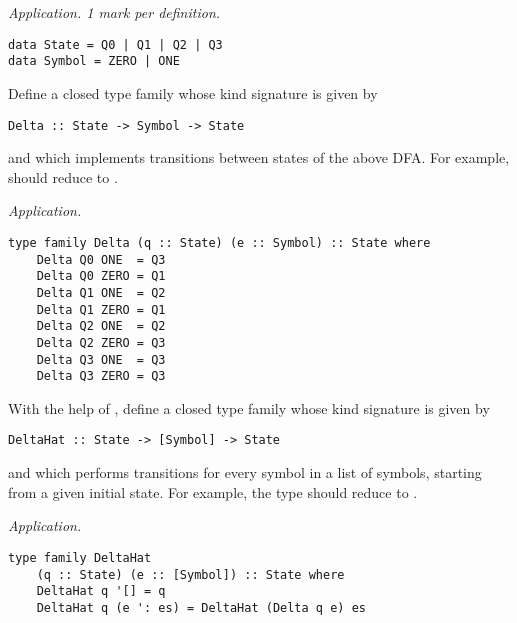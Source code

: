 \begin{parts}
\begin{subparts}
        \begin{solution}
            \emph{Application. 1 mark per definition.}
\begin{verbatim}
data State = Q0 | Q1 | Q2 | Q3 
data Symbol = ZERO | ONE
\end{verbatim}
        \end{solution}
        
        \subpart[4] Define a closed type family whose kind signature is given by
        \vspace*{0.2cm}
\begin{verbatim}
Delta :: State -> Symbol -> State
\end{verbatim}
\vspace*{0.2cm}
        and which implements transitions between states of the above DFA. For example,  should reduce to . \droppoints 
        
        \begin{solution}
            \emph{Application.}
\begin{verbatim}
type family Delta (q :: State) (e :: Symbol) :: State where 
    Delta Q0 ONE  = Q3 
    Delta Q0 ZERO = Q1 
    Delta Q1 ONE  = Q2 
    Delta Q1 ZERO = Q1
    Delta Q2 ONE  = Q2 
    Delta Q2 ZERO = Q3 
    Delta Q3 ONE  = Q3 
    Delta Q3 ZERO = Q3
\end{verbatim}
        \end{solution}
    
        \subpart[4] With the help of , define a closed type family whose kind signature is given by
        \vspace*{0.2cm}
\begin{verbatim}
DeltaHat :: State -> [Symbol] -> State
\end{verbatim}
\vspace*{0.2cm}
        and which performs transitions for every symbol in a list of symbols, starting from a given initial state. For example, the type  should reduce to . \droppoints 
        
        \begin{solution}
            \emph{Application.}
\begin{verbatim}
type family DeltaHat 
    (q :: State) (e :: [Symbol]) :: State where 
    DeltaHat q '[] = q 
    DeltaHat q (e ': es) = DeltaHat (Delta q e) es
\end{verbatim}
        \end{solution}
    

\end{subparts}
\end{parts}
